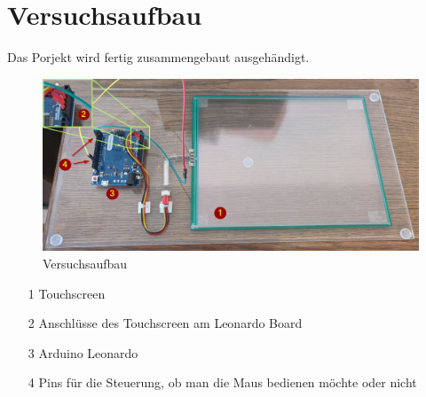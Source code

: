 \chapter{Versuchsaufbau}
Das Porjekt wird fertig zusammengebaut ausgehändigt.
\begin{figure}[ht!]
    \centering
    \includegraphics[width=\linewidth]{fig/raster/aufbau_annotated.jpg}
    \caption{Versuchsaufbau}\label{fig:aufbau}
\end{figure}
\begin{itemize}
    \item[1] Touchscreen
    \item[2] Anschlüsse des Touchscreen am Leonardo Board
    \item[3] Arduino Leonardo
    \item[4] Pins für die Steuerung, ob man die Maus bedienen möchte oder nicht
\end{itemize}